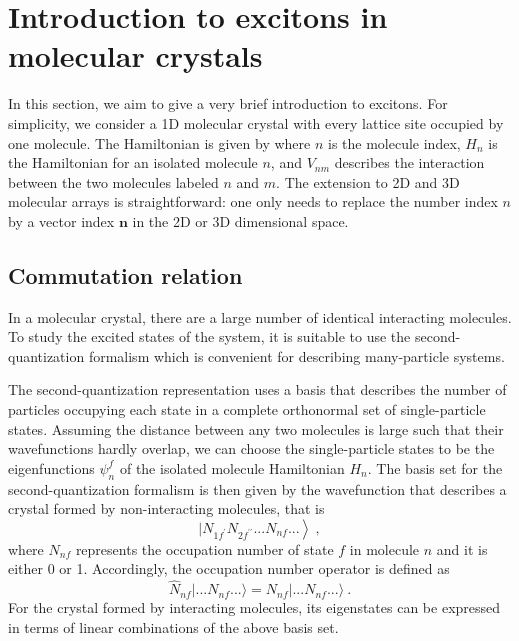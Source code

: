 \section{Introduction to excitons in molecular crystals}
\label{sec: exciton}
In this section, we aim to give a very brief introduction to excitons. For simplicity, we consider a 1D molecular 
crystal with every lattice site occupied by one molecule. The Hamiltonian is given by
where $n$ is the molecule index, $H_{n}$ is the Hamiltonian for an isolated molecule $n$, and $V_{nm}$ describes 
the interaction between the two molecules labeled $n$ and $m$. The extension to 2D and 3D molecular arrays is straightforward:
one only needs to replace the number index $n$ by a vector index $\mathbf{n}$ in the 2D or 3D dimensional space.   

\subsection{Commutation relation}
\label{sec:commutationRelation}
 
In a molecular crystal, there are a large number of identical interacting molecules. To study the excited states of the 
system, 
it is suitable to use the second-quantization formalism which is convenient for describing many-particle systems. 


The second-quantization representation uses a basis that describes the number of particles occupying each state in a 
complete orthonormal set of single-particle states. Assuming the distance between any two molecules is large such 
that their wavefunctions hardly overlap, we can choose the single-particle states  to be the eigenfunctions $\psi^f_n$ 
of the isolated molecule Hamiltonian $H_n$.  The basis set for the second-quantization formalism is  then
given by the wavefunction that describes a crystal formed by non-interacting molecules, that is
\begin{equation}
\left. |N_{1 f^{\prime}} N_{2 f^{\prime\prime}} ...N_{nf} ... \right\rangle \nonumber \ , 
\end{equation}
where $N_{nf}$ represents the occupation number of state $f$ in molecule $n$ and it is either 0 or 1. Accordingly, 
the occupation number operator is defined as
\begin{equation}
\hat{N}_{nf} |...N_{nf}...\rangle = N_{nf} |...N_{nf}...\rangle \ .
\end{equation}
For the crystal formed by interacting molecules, its eigenstates can be expressed in terms of linear combinations
of the above basis set. 


